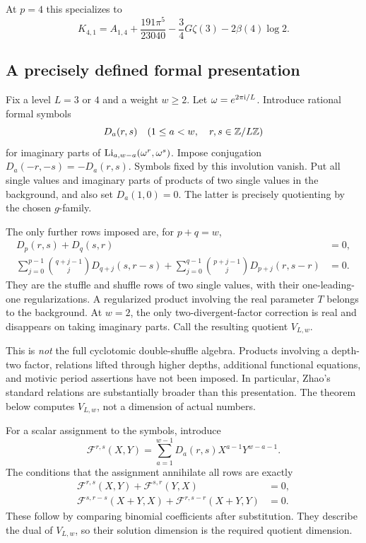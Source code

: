 At \(p=4\) this specializes to
\begin{equation}\label{cycloquot:eq:K41}
 K_{4,1}=A_{1,4}+\frac{191\pi^5}{23040}
                  -\frac34G\zeta(3)-2\beta(4)\log2.
\end{equation}

\subsection{A precisely defined formal presentation}

Fix a level \(L=3\) or \(4\) and a weight \(w\geq2\). Let
\(\omega=e^{2\pi\mathrm{i}/L}\).
Introduce rational formal symbols
\[
 D_a(r,s)\quad(1\leq a<w,\quad r,s\in\mathbb{Z}/L\mathbb{Z})
\]
for imaginary parts of \(\operatorname{Li}_{a,w-a}(\omega^r,\omega^s)\).
Impose conjugation \(D_a(-r,-s)=-D_a(r,s)\).
Symbols fixed by this involution vanish. Put all single values and
imaginary parts of products of two single values in the background,
and also set \(D_a(1,0)=0\). The latter is precisely quotienting by
the chosen \(g\)-family.

The only further rows imposed are, for \(p+q=w\),
\begin{align}
 D_p(r,s)+D_q(s,r)&=0,\label{cycloquot:eq:formal-stuffle}\\
 \sum_{j=0}^{p-1}\binom{q+j-1}{j}D_{q+j}(s,r-s)
 +\sum_{j=0}^{q-1}\binom{p+j-1}{j}D_{p+j}(r,s-r)&=0.
 \label{cycloquot:eq:formal-shuffle}
\end{align}
They are the stuffle and shuffle rows of two single values, with their
one-leading-one regularizations. A regularized product involving the
real parameter \(T\) belongs to the background. At \(w=2\), the only
two-divergent-factor correction is real and disappears on taking
imaginary parts. Call the resulting quotient \(V_{L,w}\).

This is \emph{not} the full cyclotomic double-shuffle algebra. Products
involving a depth-two factor, relations lifted through higher depths,
additional functional equations, and motivic period assertions have
not been imposed. In particular, Zhao's standard relations
\cite{cycloquot:Zhao} are substantially broader than this presentation.
The theorem below computes \(V_{L,w}\), not a dimension of actual
numbers.

For a scalar assignment to the symbols, introduce
\[
 \mathcal F^{r,s}(X,Y)=
 \sum_{a=1}^{w-1}D_a(r,s)X^{a-1}Y^{w-a-1}.
\]
The conditions that the assignment annihilate all rows are exactly
\begin{align}
 \mathcal F^{r,s}(X,Y)+\mathcal F^{s,r}(Y,X)&=0,
 \label{cycloquot:eq:poly-stuffle}\\
 \mathcal F^{s,r-s}(X+Y,X)+
       \mathcal F^{r,s-r}(X+Y,Y)&=0.
 \label{cycloquot:eq:poly-shuffle}
\end{align}
These follow by comparing binomial coefficients after substitution.
They describe the dual of \(V_{L,w}\), so their solution dimension is
the required quotient dimension.

